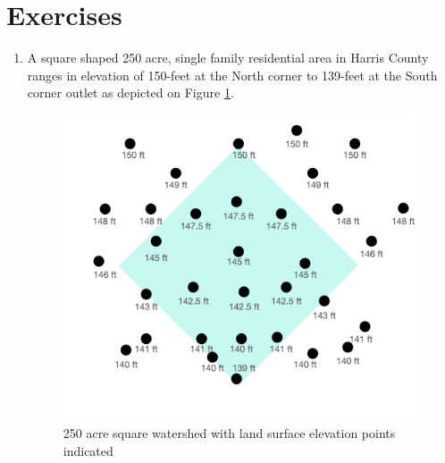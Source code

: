 \documentclass[12pt]{article}
\begin{document}
\section*{\small{Exercises}}
\begin{enumerate}
\item A square shaped 250 acre, single family residential area in Harris County ranges in elevation of 150-feet at the North corner to 139-feet at the South corner outlet as depicted on Figure \ref{fig:watershed.jpg}.

\begin{figure}[h!] %
   \centering
   \includegraphics[width=5in]{watershed.png} 
   \caption{250 acre square watershed with land surface elevation points indicated}
   \label{fig:watershed.jpg}
\end{figure} 
\clearpage


\end{enumerate}
\end{document}
